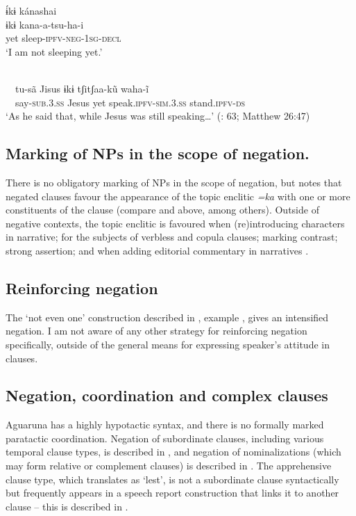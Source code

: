 \documentclass[output=paper,colorlinks,citecolor=brown,draft]{langscibook}
\begin{document}
\ea\label{ex:agu:57}
    \glll ɨ́kɨ kánashai \\ 
          ɨkɨ  kana-a-tsu-ha-i \\
           yet  sleep-\textsc{ipfv-neg-1sg-decl}\\
    \glt ‘I am not sleeping yet.’ \citep[409]{Overall2017a}
\z 

\ea\label{ex:agu:58}
     \\ 
          ~~tu-sã  Jisus  ɨkɨ  tʃitʃaa-kũ  waha-ĩ \\
          ~~say-\textsc{sub.3.ss}  Jesus  yet  speak.\textsc{ipfv-sim.3.ss}  stand.\textsc{ipfv-ds} \\
    \glt ‘As he said that, while Jesus was still speaking…’ (\citealt{LigaBíblica2008}: 63; Matthew 26:47)
\z 

\subsection{Marking of NPs in the scope of negation.}\label{sec:agu:4.3}

There is no obligatory marking of NPs in the scope of negation, but \citet[584--585]{Overall2017a} notes that negated clauses favour the appearance of the topic enclitic \textit{=ka} with one or more constituents of the clause (compare  and  above, among others). Outside of negative contexts, the topic enclitic is favoured when (re)introducing characters in narrative; for the subjects of verbless and copula clauses; marking contrast; strong assertion; and when adding editorial commentary in narratives \citep[581]{Overall2017a}.

\subsection{Reinforcing negation}\label{sec:agu:4.4}

The ‘not even one’ construction described in , example , gives an intensified negation. I am not aware of any other strategy for reinforcing negation specifically, outside of the general means for expressing speaker’s attitude in clauses.

\subsection{Negation, coordination and complex clauses}\label{sec:agu:4.5}

Aguaruna has a highly hypotactic syntax, and there is no formally marked paratactic coordination. Negation of subordinate clauses, including various temporal clause types, is described in , and negation of nominalizations (which may form relative or complement clauses) is described in . The apprehensive clause type, which translates as ‘lest’, is not a subordinate clause syntactically but frequently appears in a speech report construction that links it to another clause – this is described in .
\end{document}
